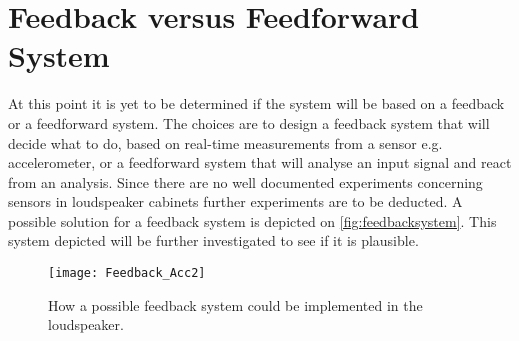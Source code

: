 \section{Feedback versus Feedforward System} \label{sec:feedback}

At this point it is yet to be determined if the system will be based on a feedback or a feedforward system. The choices are to design a feedback system that will decide what to do, based on real-time measurements from a sensor e.g. accelerometer, or a feedforward system that will analyse an input signal and react from an analysis. Since there are no well documented experiments concerning sensors in loudspeaker cabinets further experiments are to be deducted. A possible solution for a feedback system is depicted on \autoref{fig:feedbacksystem}. This system depicted will be further investigated to see if it is plausible.

\begin{figure}[H]
\centering
\texttt{[image: Feedback\_Acc2]}
\caption{How a possible feedback system could be implemented in the loudspeaker.}
\label{fig:feedbacksystem}
\end{figure}


